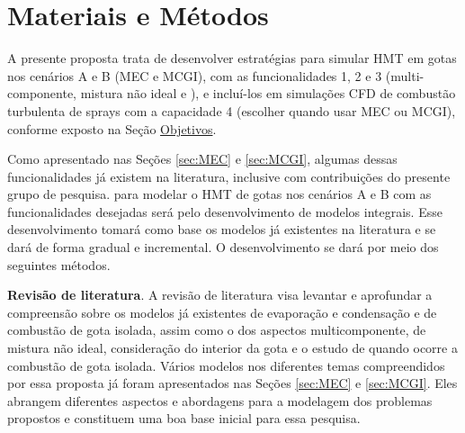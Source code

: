

\section{Materiais e Métodos} \label{sec:metod}

A presente proposta trata de desenvolver estratégias para simular HMT em gotas nos cenários {A} e {B} (MEC e MCGI), com as funcionalidades {1}, {2} e {3} (multi-componente, mistura não ideal e ), e incluí-los em simulações CFD de combustão turbulenta de sprays com a capacidade 4 (escolher quando usar MEC ou MCGI), conforme exposto na Seção \hyperref[sec:objetivos]{Objetivos}.

Como apresentado nas Seções \ref{sec:MEC} e \ref{sec:MCGI}, algumas dessas funcionalidades já existem na literatura, inclusive com contribuições do presente grupo de pesquisa.
 para modelar o HMT de gotas nos cenários {A} e {B} com as funcionalidades desejadas será pelo desenvolvimento de modelos integrais.
Esse desenvolvimento tomará como base os modelos já existentes na literatura e se dará de forma gradual e incremental.
O desenvolvimento se dará por meio dos seguintes métodos.

\textbf{Revisão de literatura}. 
A revisão de literatura visa levantar e aprofundar a compreensão sobre os modelos já  existentes de evaporação e condensação e de combustão de gota isolada, assim como o dos aspectos multicomponente, de mistura não ideal, consideração do interior da gota e o estudo de quando ocorre a combustão de gota isolada.
Vários modelos nos diferentes temas compreendidos por essa proposta já foram apresentados nas Seções \ref{sec:MEC} e \ref{sec:MCGI}.
Eles abrangem diferentes aspectos e abordagens para a modelagem dos problemas propostos e constituem uma boa base inicial para essa pesquisa. 

